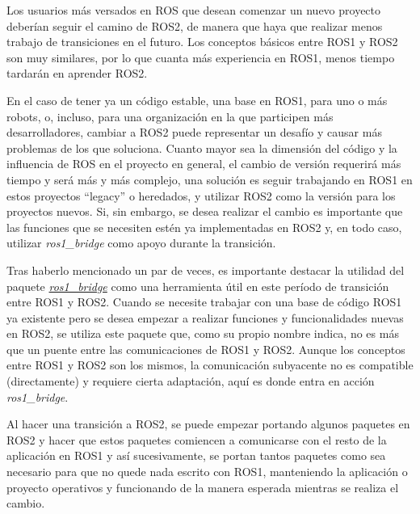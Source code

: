 Los usuarios más versados en ROS que desean comenzar un nuevo proyecto deberían seguir el camino de ROS2, de manera que haya que realizar menos trabajo de transiciones en el futuro. Los conceptos básicos entre ROS1 y ROS2 son muy similares, por lo que cuanta más experiencia en ROS1, menos tiempo tardarán en aprender ROS2.

En el caso de tener ya un código estable, una base en ROS1, para uno o más robots, o, incluso, para una organización en la que participen más desarrolladores, cambiar a ROS2 puede representar un desafío y causar más problemas de los que soluciona. Cuanto mayor sea la dimensión del código y la influencia de ROS en el proyecto en general, el cambio de versión requerirá más tiempo y será más y más complejo, una solución es seguir trabajando en ROS1 en estos proyectos ``legacy'' o heredados, y utilizar ROS2 como la versión para los proyectos nuevos. Si, sin embargo, se desea realizar el cambio es importante que las funciones que se necesiten estén ya implementadas en ROS2 y, en todo caso, utilizar \textit{ros1\_bridge} como apoyo durante la transición.

Tras haberlo mencionado un par de veces, es importante destacar la utilidad del paquete \href{https://github.com/ros2/ros1_bridge}{\textit{ros1\_bridge}} como una herramienta útil en este período de transición entre ROS1 y ROS2. Cuando se necesite trabajar con una base de código ROS1 ya existente pero se desea empezar a realizar funciones y funcionalidades nuevas en ROS2, se utiliza este paquete que, como su propio nombre indica, no es más que un puente entre las comunicaciones de ROS1 y ROS2. Aunque los conceptos entre ROS1 y ROS2 son los mismos, la comunicación subyacente no es compatible (directamente) y requiere cierta adaptación, aquí es donde entra en acción \textit{ros1\_bridge}.

Al hacer una transición a ROS2, se puede empezar portando algunos paquetes en ROS2 y hacer que estos paquetes comiencen a comunicarse con el resto de la aplicación en ROS1 y así sucesivamente, se portan tantos paquetes como sea necesario para que no quede nada escrito con ROS1, manteniendo la aplicación o proyecto operativos y funcionando de la manera esperada mientras se realiza el cambio.
